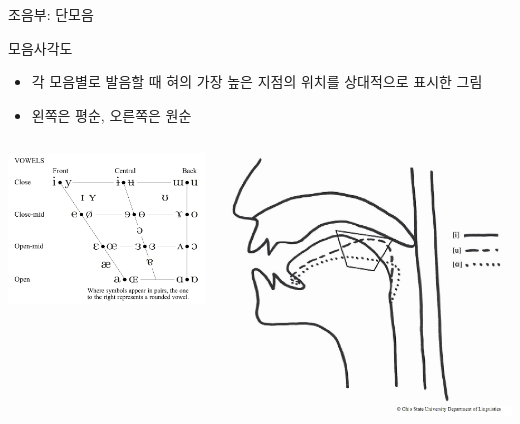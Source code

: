 \documentclass[11pt, aspectratio=169]{beamer}
\begin{document}
\begin{frame}[t]{조음부: 단모음}
    \begin{block}{모음사각도}
        \begin{itemize}
            \item 각 모음별로 발음할 때 혀의 가장 높은 지점의 위치를 상대적으로 표시한 그림
            \item 왼쪽은 평순, 오른쪽은 원순
        \end{itemize}
    \end{block}
    \begin{columns}
        \begin{column}[T]{0.47\textwidth}
            \includegraphics[width=1.0\textwidth]{img/ipa2020_vowel_chart.png}        
        \end{column}
        \begin{column}[T]{0.47\textwidth}
            \includegraphics[width=1.0\textwidth]{img/Vowel-chart-mouth.jpg}
        \end{column}
    \end{columns}
    
\end{frame}
\end{document}
